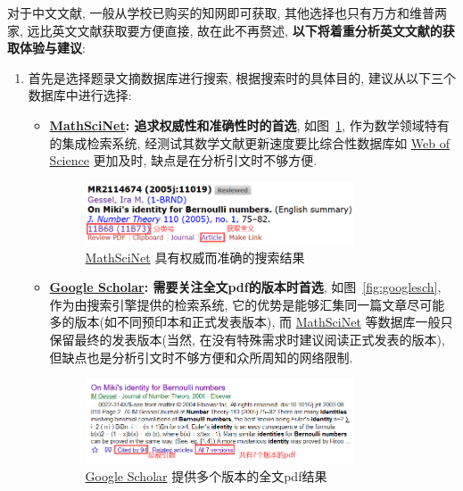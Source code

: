 \documentclass{formatBook}
\begin{document}
对于中文文献, 一般从学校已购买的知网即可获取, 其他选择也只有万方和维普两家, 远比英文文献获取要方便直接, 故在此不再赘述, \textbf{以下将着重分析英文文献的获取体验与建议}:
\begin{enumerate}
    \item 首先是选择题录文摘数据库进行搜索, 根据搜索时的具体目的, 建议从以下三个数据库中进行选择:
          \begin{itemize}
              \item \textbf{\href{https://mathscinet.ams.org/mathscinet}{MathSciNet}: 追求权威性和准确性时的首选}, 如图~\ref{fig:mathscinet}, 作为数学领域特有的集成检索系统, 经测试其数学文献更新速度要比综合性数据库如 \href{http://apps.webofknowledge.com/}{Web of Science} 更加及时, 缺点是在分析引文时不够方便.
                    \begin{figure}[H]
                        \centering
                        \includegraphics[width=0.8\textwidth]{figure/mathscinet.png}
                        \caption{\href{https://mathscinet.ams.org/mathscinet}{MathSciNet} 具有权威而准确的搜索结果}
                        \label{fig:mathscinet}
                    \end{figure}
              \item \textbf{\href{https://scholar.google.com/}{Google Scholar}: 需要关注全文pdf的版本时首选}, 如图~\ref{fig:googlesch}, 作为由搜索引擎提供的检索系统, 它的优势是能够汇集同一篇文章尽可能多的版本(如不同预印本和正式发表版本), 而 \href{https://mathscinet.ams.org/mathscinet}{MathSciNet} 等数据库一般只保留最终的发表版本(当然, 在没有特殊需求时建议阅读正式发表的版本), 但缺点也是分析引文时不够方便和众所周知的网络限制.
                    \begin{figure}[H]
                        \centering
                        \includegraphics[width=0.8\textwidth]{figure/googlescholar.png}
                        \caption{\href{https://scholar.google.com/}{Google Scholar} 提供多个版本的全文pdf结果}

\end{figure}
\end{itemize}
\end{enumerate}
\end{document}
